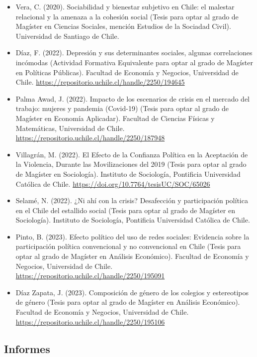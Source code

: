 \documentclass[
  12pt,
]{article}
\begin{document}
\begin{itemize}
\item
  Vera, C. (2020). Sociabilidad y bienestar subjetivo en Chile: el malestar relacional y la amenaza a la cohesión social (Tesis para optar al grado de Magíster en Ciencias Sociales, mención Estudios de la Sociadad Civil). Universidad de Santiago de Chile.
\item
  Díaz, F. (2022). Depresión y sus determinantes sociales, algunas correlaciones incómodas (Actividad Formativa Equivalente para optar al grado de Magíster en Políticas Públicas). Facultad de Economía y Negocios, Universidad de Chile. \url{https://repositorio.uchile.cl/handle/2250/194645}
\item
  Palma Awad, J. (2022). Impacto de los escenarios de crisis en el mercado del trabajo: mujeres y pandemia (Covid-19) (Tesis para optar al grado de Magíster en Economía Aplicadar). Facultad de Ciencias Físicas y Matemáticas, Universidad de Chile. \url{https://repositorio.uchile.cl/handle/2250/187948}
\item
  Villagrán, M. (2022). El Efecto de la Confianza Política en la Aceptación de la Violencia, Durante las Movilizaciones del 2019 (Tesis para optar al grado de Magíster en Sociología). Instituto de Sociología, Pontificia Universidad Católica de Chile. \url{https://doi.org/10.7764/tesisUC/SOC/65026}
\item
  Selamé, N. (2022). ¿Ni ahí con la crisis? Desafección y participación política en el Chile del estallido social (Tesis para optar al grado de Magíster en Sociología). Instituto de Sociología, Pontificia Universidad Católica de Chile.
\item
  Pinto, B. (2023). Efecto político del uso de redes sociales: Evidencia sobre la participación política convencional y no convencional en Chile (Tesis para optar al grado de Magíster en Análisis Económico). Facultad de Economía y Negocios, Universidad de Chile. \url{https://repositorio.uchile.cl/handle/2250/195091}
\item
  Díaz Zapata, J. (2023). Composición de género de los colegios y estereotipos de género (Tesis para optar al grado de Magíster en Análisis Económico). Facultad de Economía y Negocios, Universidad de Chile. \url{https://repositorio.uchile.cl/handle/2250/195106}
\end{itemize}

\hypertarget{informes}{%
\subsection{Informes}\label{informes}}
\end{document}
